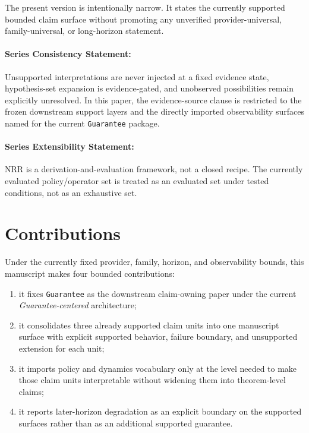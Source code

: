 \documentclass[11pt]{article}
\begin{document}
The present version is intentionally narrow. It states the currently supported
bounded claim surface without promoting any unverified provider-universal,
family-universal, or long-horizon statement.

\paragraph{Series Consistency Statement:}
Unsupported interpretations are never injected at a fixed evidence state,
hypothesis-set expansion is evidence-gated, and unobserved possibilities remain
explicitly unresolved. In this paper, the evidence-source clause is restricted to
the frozen downstream support layers and the directly imported observability
surfaces named for the current \texttt{Guarantee} package.

\paragraph{Series Extensibility Statement:}
NRR is a derivation-and-evaluation framework, not a closed recipe. The currently
evaluated policy/operator set is treated as an evaluated set under tested
conditions, not as an exhaustive set.

\section{Contributions}

Under the currently fixed provider, family, horizon, and observability bounds,
this manuscript makes four bounded contributions:

\begin{enumerate}
\item it fixes \texttt{Guarantee} as the downstream claim-owning paper under the
current \textit{Guarantee-centered} architecture;
\item it consolidates three already supported claim units into one manuscript
surface with explicit supported behavior, failure boundary, and unsupported
extension for each unit;
\item it imports policy and dynamics vocabulary only at the level needed to make
those claim units interpretable without widening them into theorem-level claims;
\item it reports later-horizon degradation as an explicit boundary on the
supported surfaces rather than as an additional supported guarantee.
\end{enumerate}
\end{document}
